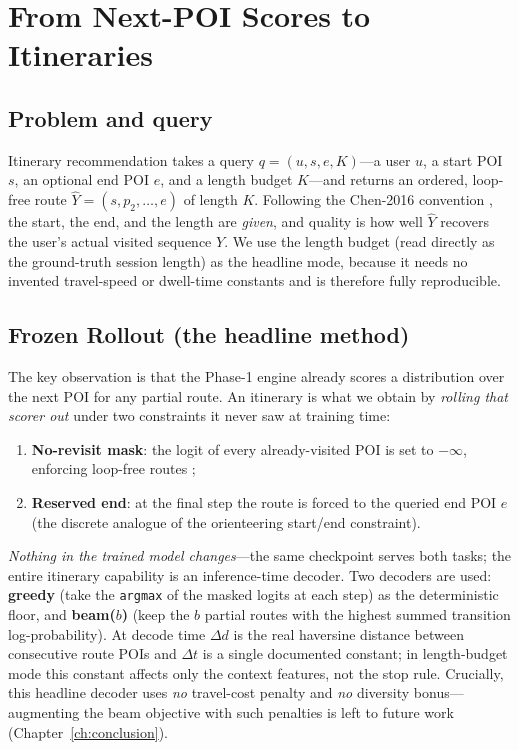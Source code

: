 \section{From Next-POI Scores to Itineraries}
\label{sec:sol-decoding}

\subsection{Problem and query}
\label{sec:sol-decoding-query}

Itinerary recommendation takes a query $q=(u,s,e,K)$---a user $u$, a start POI $s$, an
optional end POI $e$, and a length budget $K$---and returns an ordered, loop-free route
$\hat{Y}=(s,p_2,\dots,e)$ of length $K$. Following the Chen-2016 convention
\cite{chen2016learning}, the start, the end, and the length are \emph{given}, and quality is
how well $\hat{Y}$ recovers the user's actual visited sequence $Y$. We use the length budget
(read directly as the ground-truth session length) as the headline mode, because it needs no
invented travel-speed or dwell-time constants and is therefore fully reproducible.

\subsection{Frozen Rollout (the headline method)}
\label{sec:sol-decoding-rollout}

The key observation is that the Phase-1 engine already scores a distribution over the next POI
for any partial route. An itinerary is what we obtain by \emph{rolling that scorer out} under
two constraints it never saw at training time:
\begin{enumerate}[label=(\roman*),leftmargin=*]
  \item \textbf{No-revisit mask}: the logit of every already-visited POI is set to $-\infty$,
        enforcing loop-free routes \cite{menon2017revisits};
  \item \textbf{Reserved end}: at the final step the route is forced to the queried end POI
        $e$ (the discrete analogue of the orienteering start/end constraint).
\end{enumerate}
\emph{Nothing in the trained model changes}---the same checkpoint serves both tasks; the entire
itinerary capability is an inference-time decoder. Two decoders are used: \textbf{greedy}
(take the \texttt{argmax} of the masked logits at each step) as the deterministic floor, and
\textbf{beam($b$)} (keep the $b$ partial routes with the highest summed transition
log-probability). At decode time $\Delta d$ is the real haversine distance between consecutive
route POIs and $\Delta t$ is a single documented constant; in length-budget mode this constant
affects only the context features, not the stop rule. Crucially, this headline decoder uses
\emph{no} travel-cost penalty and \emph{no} diversity bonus---augmenting the beam objective
with such penalties is left to future work (Chapter~\ref{ch:conclusion}).

